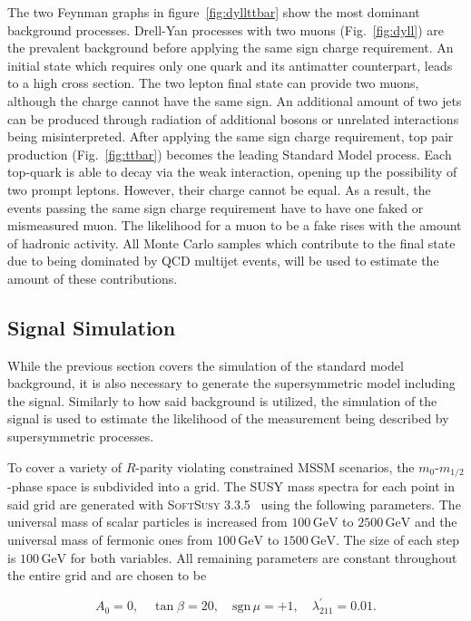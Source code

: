 The two Feynman graphs in figure~\ref{fig:dyllttbar} show the most dominant background processes. Drell-Yan processes with two muons (Fig.~\ref{fig:dyll}) are the prevalent background before applying the same sign charge requirement. An initial state which requires only one quark and its antimatter counterpart, leads to a high cross section. The two lepton final state can provide two muons, although the charge cannot have the same sign. An additional amount of two jets can be produced through radiation of additional bosons or unrelated interactions being misinterpreted. After applying the same sign charge requirement, top pair production (Fig.~\ref{fig:ttbar}) becomes the leading Standard Model process. Each top-quark is able to decay via the weak interaction, opening up the possibility of two prompt leptons. However, their charge cannot be equal. As a result, the events passing the same sign charge requirement have to have one faked or mismeasured muon. The likelihood for a muon to be a fake rises with the amount of hadronic activity. All Monte Carlo samples which contribute to the final state due to being dominated by QCD multijet events, will be used to estimate the amount of these contributions.


\subsection{Signal Simulation}
\label{sec:signal-sim}

While the previous section covers the simulation of the standard model background, it is also necessary to generate the supersymmetric model including the signal. Similarly to how said background is utilized, the simulation of the signal is used to estimate the likelihood of the measurement being described by supersymmetric processes.

To cover a variety of $R$-parity violating constrained MSSM scenarios, the $m_0$-$m_{1/2}$-phase space is subdivided into a grid. The SUSY mass spectra for each point in said grid are generated with \textsc{SoftSusy 3.3.5}~\cite{softsusy,sonnegueth} using the following parameters. The universal mass of scalar particles is increased from $100\,\text{GeV}$ to $2500\,\text{GeV}$ and the universal mass of fermonic ones from $100\,\text{GeV}$ to $1500\,\text{GeV}$. The size of each step is $100\,\text{GeV}$ for both variables. All remaining parameters are constant throughout the entire grid and are chosen to be

\begin{equation}
  \label{eq:gen-mssm-parameters}
  A_0 = 0, \quad \tan{\beta} = 20, \quad \text{sgn}\,\mu = +1, \quad \lambda^\prime_{211} = 0.01.
\end{equation}

